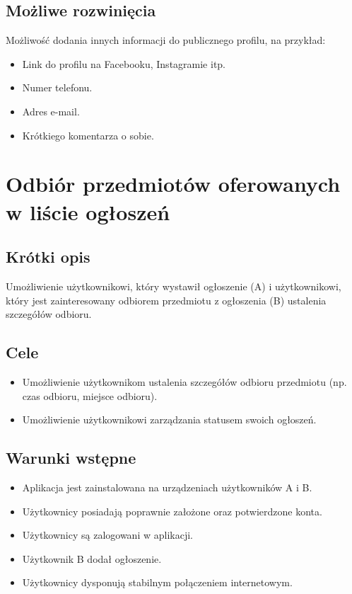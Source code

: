 \documentclass[12pt,a4paper,twoside]{article}
\begin{document}
    \subsection{Możliwe rozwinięcia}
    Możliwość dodania innych informacji do publicznego profilu, na przykład:
    \begin{itemize}
        \item Link do profilu na Facebooku, Instagramie itp.
        \item Numer telefonu.
        \item Adres e-mail.
        \item Krótkiego komentarza o sobie.
    \end{itemize}
    
    
    
    
        \section{Odbiór przedmiotów oferowanych w liście ogłoszeń}
    
    \subsection{Krótki opis}
    
    Umożliwienie użytkownikowi, który wystawił ogłoszenie (A) i użytkownikowi, który jest zainteresowany odbiorem przedmiotu z ogłoszenia (B) ustalenia szczegółów odbioru.
    
    
    \subsection{Cele}
    \begin{itemize}
        \item Umożliwienie użytkownikom ustalenia szczegółów odbioru przedmiotu (np. czas odbioru, miejsce odbioru).
        \item Umożliwienie użytkownikowi zarządzania statusem swoich ogłoszeń.
    \end{itemize}
    
    
    \subsection{Warunki wstępne}
    \begin{itemize}
        \item Aplikacja jest zainstalowana na urządzeniach użytkowników A i B.
        \item Użytkownicy posiadają poprawnie założone oraz potwierdzone konta.
        \item Użytkownicy są zalogowani w aplikacji.
        \item Użytkownik B dodał ogłoszenie.
        \item Użytkownicy dysponują stabilnym połączeniem internetowym.
    \end{itemize}
    
\end{document}
